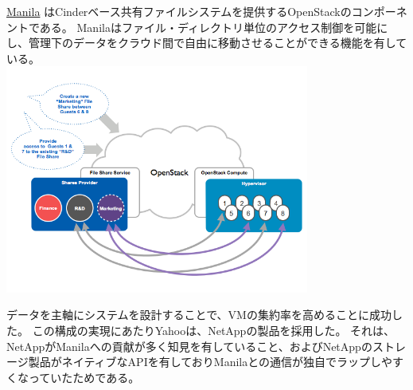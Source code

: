\href{https://wiki.openstack.org/wiki/Manila}{Manila} はCinderベース共有ファイルシステムを提供するOpenStackのコンポーネントである。
Manilaはファイル・ディレクトリ単位のアクセス制御を可能にし、管理下のデータをクラウド間で自由に移動させることができる機能を有している。\\

\includegraphics[width=10cm]{Manila_Concept.png}

データを主軸にシステムを設計することで、VMの集約率を高めることに成功した。
この構成の実現にあたりYahooは、NetAppの製品を採用した。
それは、NetAppがManilaへの貢献が多く知見を有していること、およびNetAppのストレージ製品がネイティブなAPIを有しておりManilaとの通信が独自でラップしやすくなっていたためである。
